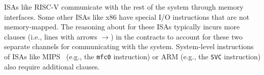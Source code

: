 ISAs like RISC-V communicate with the rest of the system through memory interfaces.
Some other ISAs like x86 have special I/O instructions that are not memory-mapped.
The reasoning about \pics for these ISAs typically incurs more clauses (i.e., lines with arrows $\rightarrow$) in the contracts to account for these two separate channels for communicating with the system.
System-level instructions of ISAs like MIPS~\cite{mips_isa} (e.g., the \texttt{mfc0} instruction) or ARM (e.g., the \texttt{SVC} instruction) also require additional clauses.
